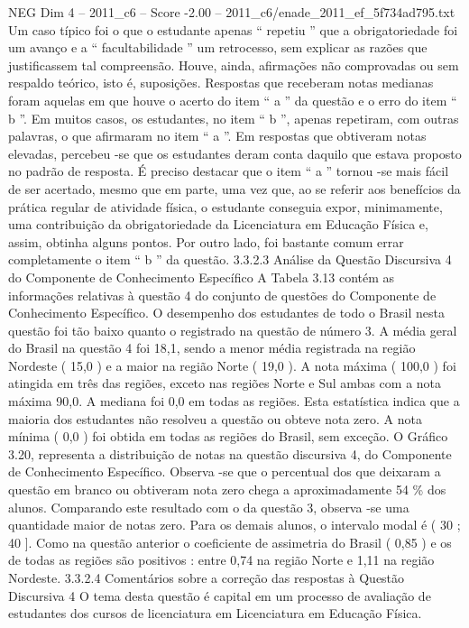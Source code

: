 \begin{textsample}{NEG Dim 4 – 2011\_c6 – Score -2.00 – 2011\_c6/enade\_2011\_ef\_5f734ad795.txt}
Um caso típico foi o que o estudante apenas “ repetiu ” que a obrigatoriedade foi um avanço e a “ facultabilidade ” um retrocesso, sem explicar as razões que justificassem tal compreensão.
Houve, ainda, afirmações não comprovadas ou sem respaldo teórico, isto é, suposições.
Respostas que receberam notas medianas foram aquelas em que houve o acerto do item “ a ” da questão e o erro do item “ b ”.
Em muitos casos, os estudantes, no item “ b ”, apenas repetiram, com outras palavras, o que afirmaram no item “ a ”.
Em respostas que obtiveram notas elevadas, percebeu -se que os estudantes deram conta daquilo que estava proposto no padrão de resposta.
É preciso destacar que o item “ a ” tornou -se mais fácil de ser acertado, mesmo que em parte, uma vez que, ao se referir aos benefícios da prática regular de atividade física, o estudante conseguia expor, minimamente, uma contribuição da obrigatoriedade da Licenciatura em Educação Física e, assim, obtinha alguns pontos.
Por outro lado, foi bastante comum errar completamente o item “ b ” da questão. 3.3.2.3 Análise da Questão Discursiva 4 do Componente de Conhecimento Específico A Tabela 3.13 contém as informações relativas à questão 4 do conjunto de questões do Componente de Conhecimento Específico.
O desempenho dos estudantes de todo o Brasil nesta questão foi tão baixo quanto o registrado na questão de número 3.
A média geral do Brasil na questão 4 foi 18,1, sendo a menor média registrada na região Nordeste ( 15,0 ) e a maior na região Norte ( 19,0 ).
A nota máxima ( 100,0 ) foi atingida em três das regiões, exceto nas regiões Norte e Sul ambas com a nota máxima 90,0.
A mediana foi 0,0 em todas as regiões.
Esta estatística indica que a maioria dos estudantes não resolveu a questão ou obteve nota zero.
A nota mínima ( 0,0 ) foi obtida em todas as regiões do Brasil, sem exceção.
O Gráfico 3.20, representa a distribuição de notas na questão discursiva 4, do Componente de Conhecimento Específico.
Observa -se que o percentual dos que deixaram a questão em branco ou obtiveram nota zero chega a aproximadamente 54 \% dos alunos.
Comparando este resultado com o da questão 3, observa -se uma quantidade maior de notas zero.
Para os demais alunos, o intervalo modal é ( 30 ; 40 ].
Como na questão anterior o coeficiente de assimetria do Brasil ( 0,85 ) e os de todas as regiões são positivos : entre 0,74 na região Norte e 1,11 na região Nordeste. 3.3.2.4 Comentários sobre a correção das respostas à Questão Discursiva 4 O tema desta questão é capital em um processo de avaliação de estudantes dos cursos de licenciatura em Licenciatura em Educação Física.

\end{textsample}
